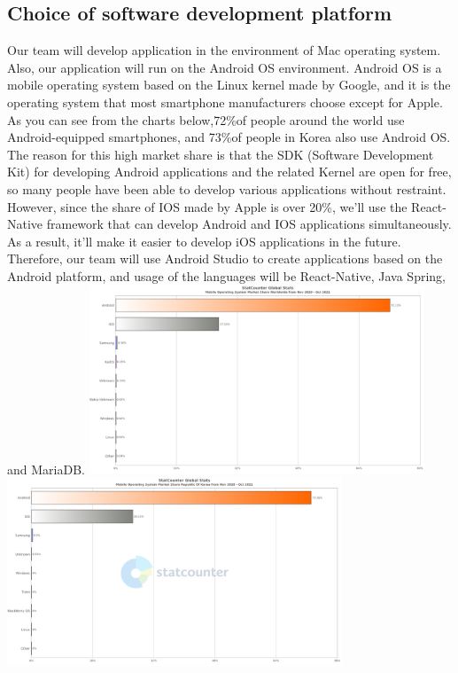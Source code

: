 \documentclass[conference]{IEEEtran}
\numberwithin{figure}{subsection}
\begin{document}
\subsection{Choice of software development platform}
Our team will develop application in the environment of Mac operating system. Also, our application will run on the Android OS environment. Android OS is a mobile operating system based on the Linux kernel made by Google, and it is the operating system that most smartphone manufacturers choose except for Apple. As you can see from the charts below,72\%of people around the world use Android-equipped smartphones, and 73\%of people in Korea also use Android OS. The reason for this high market share is that the SDK (Software Development Kit) for developing Android applications and the related Kernel are open for free, so many people have been able to develop various applications without restraint. However, since the share of IOS made by Apple is over 20\%, we'll use the React-Native framework that can develop Android and IOS applications simultaneously. As a result, it'll make it easier to develop iOS applications in the future. Therefore, our team will use Android Studio to create applications based on the Android platform, and usage of the languages will be React-Native, Java Spring, and MariaDB.
\includegraphics[width=10cm]{globalstats1.png}
\includegraphics[width=10cm]{globalstats2.png}
\end{document}
